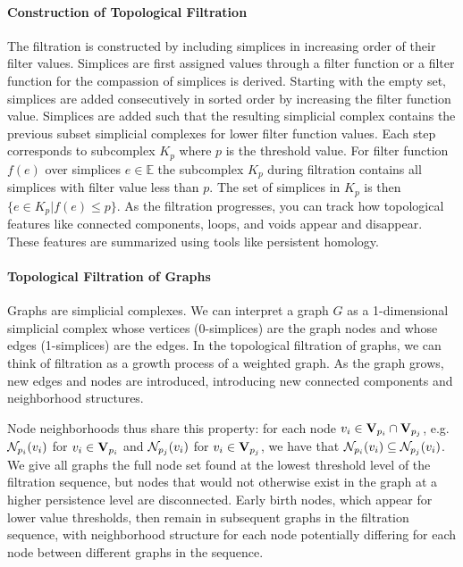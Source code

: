 \paragraph{Construction of Topological Filtration}
The filtration is constructed by including simplices in increasing order of their filter values. Simplices are first assigned values through a filter function or a filter function for the compassion of simplices is derived. Starting with the empty set, simplices are added consecutively in sorted order by increasing the filter function value. Simplices are added such that the resulting simplicial complex contains the previous subset simplicial complexes for lower filter function values. Each step corresponds to subcomplex $K_p$ where $p$ is the threshold value. For filter function $f(e)$ over simplices $e\in \mathbb{E}$ the subcomplex $K_p$ during filtration contains all simplices with filter value less than $p$. The set of simplices in $K_p$ is then $\{e\in K_p | f(e)\leq p\}$. As the filtration progresses, you can track how topological features like connected components, loops, and voids appear and disappear. These features are summarized using tools like persistent homology.  

%
\paragraph{Topological Filtration of Graphs}
Graphs are simplicial complexes. We can interpret a graph $G$ as a 1-dimensional simplicial complex whose vertices (0-simplices) are the graph nodes and whose edges (1-simplices) are the edges. In the topological filtration of graphs, we can think of filtration as a growth process of a weighted graph. As the graph grows, new edges and nodes are introduced, introducing new connected components and neighborhood structures.

Node neighborhoods thus share this property: for each node $v_i \in \mathbf{V}_{p_i} \cap \mathbf{V}_{p_j}$, e.g. $\mathcal{N}_{p_i}(v_i)$ for $v_i \in \mathbf{V}_{p_i}$ and $\mathcal{N}_{p_j}(v_i)$ for $v_i \in \mathbf{V}_{p_j}$, we have that $\mathcal{N}_{p_i}(v_i) \subseteq \mathcal{N}_{p_j}(v_i)$. %
We give all graphs the full node set found at the lowest threshold level of the filtration sequence, but nodes that would not otherwise exist in the graph at a higher persistence level are disconnected. Early birth nodes, which appear for lower value thresholds, then remain in subsequent graphs in the filtration sequence, with neighborhood structure for each node potentially differing for each node between different graphs in the sequence.%

